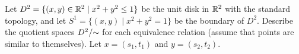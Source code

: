 \ea

\begin{comment}

\ExerciseSolution

\ba
\item Since 
\begin{align*}
p^{-1}(\{a\}) &= \{1,2\} \in \tau \\
p^{-1}(\{b\}) &= \{3\} \notin \tau \\
p^{-1}(\{c\}) &= \{4\} \notin \tau \\
p^{-1}(\{a,b\}) &= \{1,2,3\} \notin \tau \\
p^{-1}(\{a,c\}) &= \{1,2,4\} \notin \tau \\
p^{-1}(\{b,c\}) &= \{3,4\} \in \tau,
\end{align*}
we have that $\tau_p = \{\emptyset, \{a\}, \{b,c\}, Y\}$. 

\[\tau = \{\emptyset, \{1\}, \{2\}, \{1, 2\}, \{3, 4\}, \{2, 3, 4\}, \{1, 3, 4\}, \{1, 2, 3, 4\}\}.\]
Let $Y = \{a, b, c\}$.
\item Since 
\begin{align*}
q^{-1}(\{a\}) &= \{4\} \notin \tau \\
q^{-1}(\{b\}) &= \{3\} \notin \tau \\
q^{-1}(\{c\}) &= \{1,2\} \in \tau \\
q^{-1}(\{a,b\}) &= \{3,4\} \in \tau \\
q^{-1}(\{a,c\}) &= \{1,2,4\} \notin \tau \\
q^{-1}(\{b,c\}) &= \{1,2,3\} \notin \tau,
\end{align*}
we have that $\tau_q = \{\emptyset, \{c\}, \{a,b\}, Y\}$. 

\item Define $f : Y \to Y$ by $f(a) = c$, $f(b) = a$, and $f(c) = b$. Note that $f$ is a bijection by construction. Since 
\[f^{-1}(\{c\}) = \{a\} \ \text{ and } \ f^{-1}(\{a,b\}) = \{b,c\}\]
we see that the inverse image of every open set is an open set. So $f$ is continuous. Also,
\[f(\{a\}) = \{c\} \ \text{ and } \ f(\{b,c\}) = \{a,b\},\]
and the image of every open set is open. So $f^{-1}$ is continuous. We conclude that $f$ is a homeomorphism and that $(Y, \tau_p)$ and $(Y, \tau_q)$ are homeomorphic spaces. 

\ea


\end{comment}

\item Let $D^2 = \{(x,y) \in \mathbb{R}^2 \mid x^2+y^2 \leq 1\}$ be the unit disk in $\mathbb{R}^2$ with the standard topology, and let $S^1 = \{(x,y) \mid x^2+y^2 = 1\}$ be the boundary of $D^2$. Describe the quotient spaces $D^2/\hspace{-1mm}\sim$ for each equivalence relation (assume that points are similar to themselves). Let $x = (s_1,t_1)$ and $y = (s_2,t_2)$. 

